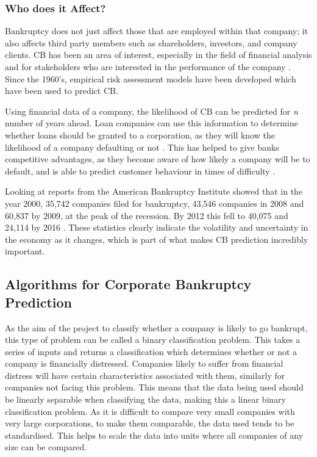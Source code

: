 \documentclass[11pt]{article}
\begin{document}
\subsubsection{Who does it Affect?}\label{subsubsec:affect}
Bankruptcy does not just affect those that are employed within that company; it also affects third party members such as shareholders, investors, and company clients. CB has been an area of interest, especially in the field of financial analysis and for stakeholders who are interested in the performance of the company \cite{ref-four}. Since the 1960's, empirical risk assessment models have been developed which have been used to predict CB. 

Using financial data of a company, the likelihood of CB can be predicted for \textit{n} number of years ahead. 
Loan companies can use this information to determine whether loans should be granted to a corporation, as they will know the likelihood of a company defaulting or not \cite{ref-four}. This has helped to give banks competitive advantages, as they become aware of how likely a company will be to default, and is able to predict customer behaviour in times of difficulty \cite{ref-four}.

Looking at reports from the American Bankruptcy Institute \cite{ref-five} showed that in the year 2000, 35,742 companies filed for bankruptcy, 43,546 companies in 2008 and 60,837 by 2009, at the peak of the recession. By 2012 this fell to 40,075 and 24,114 by 2016 . These statistics clearly indicate the volatility and uncertainty in the economy as it changes, which is part of what makes CB prediction incredibly important.
\subsection{Algorithms for Corporate Bankruptcy Prediction}\label{subsec:algos}
As the aim of the project to classify whether a company is likely to go bankrupt, this type of problem can be called a binary classification problem. This takes a series of inputs and returns a classification which determines whether or not a company is financially distressed. Companies likely to suffer from financial distress will have certain characteristics associated with them, similarly for companies not facing this problem. This means that the data being used should be linearly separable when classifying the data, making this a linear binary classification problem. As it is difficult to compare very small companies with very large corporations, to make them comparable, the data used tends to be standardised. This helps to scale the data into units where all companies of any size can be compared. 
\end{document}
